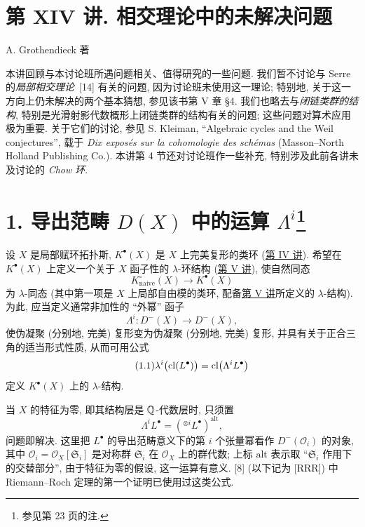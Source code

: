 \section*{第 XIV 讲. 相交理论中的未解决问题}
\begin{center}
A. Grothendieck 著
\end{center}

本讲回顾与本讨论班所遇问题相关、值得研究的一些问题. 我们暂不讨论与 Serre 的\emph{局部相交理论}~[14] 有关的问题, 因为讨论班未使用这一理论; 特别地, 关于这一方向上仍未解决的两个基本猜想, 参见该书第 V 章 \S4. 我们也略去与\emph{闭链类群的结构}, 特别是光滑射影代数概形上闭链类群的结构有关的问题; 这些问题对算术应用极为重要. 关于它们的讨论, 参见 S. Kleiman, ``Algebraic cycles and the Weil conjectures'', 载于 \emph{Dix expos\'es sur la cohomologie des sch\'emas} (Masson--North Holland Publishing Co.). 本讲第 4 节还对讨论班作一些补充, 特别涉及此前各讲未及讨论的 \emph{Chow 环}.

\section*{1. 导出范畴 $D(X)$ 中的运算 $\Lambda^i$\footnote{参见第 23 页的注.}}

设 $X$ 是局部赋环拓扑斯, $K^\bullet(X)$ 是 $X$ 上完美复形的类环 (\hyperlink{sga6.e04.expose}{第 IV 讲}). 希望在 $K^\bullet(X)$ 上定义一个关于 $X$ 函子性的 $\lambda$-环结构 (\hyperlink{sga6.e05.expose}{第 V 讲}), 使自然同态
\[
  K^\circ_{\mathrm{naive}}(X)\longrightarrow K^\bullet(X)
\]
为 $\lambda$-同态 (其中第一项是 $X$ 上局部自由模的类环, 配备\hyperlink{sga6.e05.expose}{第 V 讲}所定义的 $\lambda$-结构). 为此, 应当定义通常非加性的 ``外幂'' 函子
\[
  \Lambda^i:D^-(X)\longrightarrow D^-(X),
\]
使伪凝聚 (分别地, 完美) 复形变为伪凝聚 (分别地, 完美) 复形, 并具有关于正合三角的适当形式性质, 从而可用公式
\begin{equation}\tag{1.1}
  \lambda^i\bigl(\operatorname{cl}(L^\bullet)\bigr)
  =\operatorname{cl}\bigl(\Lambda^iL^\bullet\bigr)
\end{equation}
定义 $K^\bullet(X)$ 上的 $\lambda$-结构.

当 $X$ 的特征为零, 即其结构层是 $\mathbb Q$-代数层时, 只须置
\begin{equation}\tag{1.2}
  \Lambda^iL^\bullet
  =\left({}^{\otimes i}L^\bullet\right)^{\mathrm{alt}},
\end{equation}
问题即解决. 这里把 $L^\bullet$ 的导出范畴意义下的第 $i$ 个张量幂看作 $D^-(\mathcal O_i)$ 的对象, 其中 $\mathcal O_i=\mathcal O_X[\mathfrak S_i]$ 是对称群 $\mathfrak S_i$ 在 $\mathcal O_X$ 上的群代数; 上标 \(\mathrm{alt}\) 表示取 ``$\mathfrak S_i$ 作用下的交替部分'', 由于特征为零的假设, 这一运算有意义. [8] (以下记为 [RRR]) 中 Riemann--Roch 定理的第一个证明已使用过这类公式.

